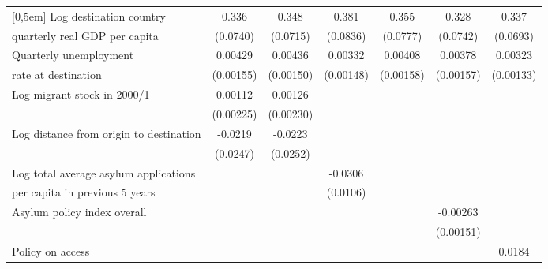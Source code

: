 \begin{table}[!ht]
\begin{tabular}{l*{6}{c}}
[0,5em]
Log destination country&       0.336\sym{***}&       0.348\sym{***}&       0.381\sym{***}&       0.355\sym{***}&       0.328\sym{***}&       0.337\sym{***}\\
 quarterly real GDP per capita                    &    (0.0740)         &    (0.0715)         &    (0.0836)         &    (0.0777)         &    (0.0742)         &    (0.0693)         \\
[0,5em]
Quarterly unemployment&     0.00429\sym{**} &     0.00436\sym{**} &     0.00332\sym{*}  &     0.00408\sym{*}  &     0.00378\sym{*}  &     0.00323\sym{*}  \\
 rate at destination                    &   (0.00155)         &   (0.00150)         &   (0.00148)         &   (0.00158)         &   (0.00157)         &   (0.00133)         \\
[0,5em]
Log migrant stock in 2000/1&     0.00112         &     0.00126         &                     &                     &                     &                     \\
                    &   (0.00225)         &   (0.00230)         &                     &                     &                     &                     \\
[0,5em]
Log distance from origin to destination&     -0.0219         &     -0.0223         &                     &                     &                     &                     \\
                    &    (0.0247)         &    (0.0252)         &                     &                     &                     &                     \\
[0,5em]
Log total average asylum applications &                     &                     &     -0.0306\sym{**} &                     &                     &                     \\
per capita in previous 5 years                    &                     &                     &    (0.0106)         &                     &                     &                     \\
[0,5em]
Asylum policy index overall&                     &                     &                     &                     &    -0.00263         &                     \\
                    &                     &                     &                     &                     &   (0.00151)         &                     \\
[0,5em]
Policy on access    &                     &                     &                     &                     &                     &      0.0184\sym{***}\\

\end{tabular}
\end{table}
